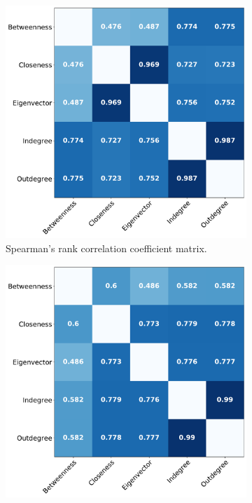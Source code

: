 \documentclass{Template_resources/netsci-project}
\begin{document}
\begin{figure}[!h]
    \begin{subfigure}[t]{0.5\textwidth}
        \centering
        \includegraphics[width=\linewidth]{Figures/spearman_matrix.pdf}
        \caption{\raggedleft Spearman's rank correlation coefficient matrix.}
        \label{fig:spearman_matrix}
    \end{subfigure}
    \hfill
    \begin{subfigure}[t]{0.5\textwidth}
        \centering
        \includegraphics[width=\linewidth]{Figures/node_remove_overlap_matrix.pdf}

\end{subfigure}
\end{figure}
\end{document}
